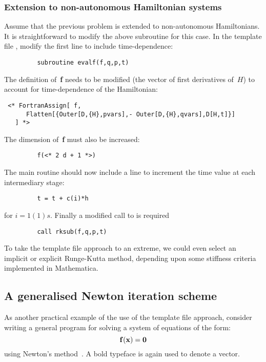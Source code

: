 \documentclass [12pt,twoside]{article}
\begin{document}
\pagebreak[2]

\subsubsection{Extension to non-autonomous Hamiltonian systems}
Assume that the previous problem is extended to non-autonomous Hamiltonians.
It is straightforward to modify the above subroutine for this case. 
In the template file , modify the first line to include
time-dependence:
\begin{verbatim}
         subroutine evalf(f,q,p,t)
\end{verbatim}
The definition of~{\bf f} needs to be modified (the vector of first derivatives
of~$H$) to account for time-dependence of the Hamiltonian:
\begin{verbatim}
 <* FortranAssign[ f,
      Flatten[{Outer[D,{H},pvars],- Outer[D,{H},qvars],D[H,t]}]
   ] *>
\end{verbatim}
The dimension of~{\bf f} must also be increased:
\begin{verbatim}
         f(<* 2 d + 1 *>)
\end{verbatim}
The main routine should now include a line to increment the time value at each
intermediary stage:
\begin{verbatim}
         t = t + c(i)*h
\end{verbatim}
for $i = 1(1)s$. Finally a modified call to  is required
\begin{verbatim}
         call rksub(f,q,p,t)
\end{verbatim}
To take the template file approach to an extreme, we could even select an implicit
or explicit Runge-Kutta method, depending upon some stiffness criteria
implemented in Mathematica.

\pagebreak[2]

\subsection{A generalised Newton iteration scheme}

As another practical example of the use of the template file approach,
consider writing a general program for solving a system of equations of
the form: 
\begin{equation}\label{form_newt_zeq}
{\bf f}({\bf x})={\bf 0}
\end{equation}
using Newton's method~\cite{stoer}. A bold typeface is again used to
denote a vector.
\end{document}
